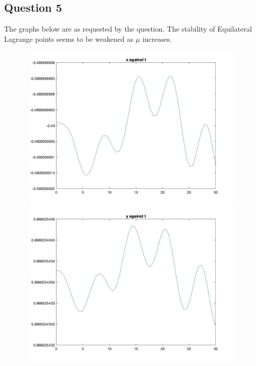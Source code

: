 \documentclass[11pt]{article}
\begin{document}
\subsection{Question 5}
The graphs below are as requested by the question. The stability of Equilateral Lagrange points seems to be weakened as $\mu$ increases.
\newpage
\begin{figure}[H]
\includegraphics[width = 12cm, height = 8cm]{Q5(1).jpg}
\includegraphics[width = 12cm, height = 8cm]{Q5(2).jpg}
\end{figure}
\end{document}
